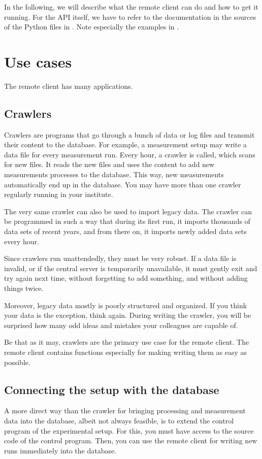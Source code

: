 \documentclass[a4paper,11pt,english]{sphinxmanual}
\begin{document}
In the following, we will describe what the remote client can do and how to get
it running.  For the API itself, we have to refer to the documentation in the
sources of the Python files in .  Note especially the
examples in .


\section{Use cases}
\label{programming/remote_client:use-cases}
The remote client has many applications.


\subsection{Crawlers}
\label{programming/remote_client:crawlers}\label{programming/remote_client:index-1}
Crawlers are programs that go through a bunch of data or log files and transmit
their content to the database.  For example, a measurement setup may write a
data file for every measurement run.  Every hour, a crawler is called, which
scans for new files.  It reads the new files and uses the content to add new
measurements processes to the database.  This way, new measurements
automatically end up in the database.  You may have more than one crawler
regularly running in your institute.

The very same crawler can also be used to import legacy data.  The crawler can
be programmed in such a way that during its first run, it imports thousands of
data sets of recent years, and from there on, it imports newly added data sets
every hour.

Since crawlers run unattendedly, they must be very robust.  If a data file is
invalid, or if the central server is temporarily unavailable, it must gently
exit and try again next time, without forgetting to add something, and without
adding things twice.

Moreover, legacy data mostly is poorly structured and organized.  If you think
your data is the exception, think again.  During writing the crawler, you will
be surprised how many odd ideas and mistakes your colleagues are capable of.

Be that as it may, crawlers are the primary use case for the remote client.
The remote client contains functions especially for making writing them as easy
as possible.


\subsection{Connecting the setup with the database}
\label{programming/remote_client:connecting-the-setup-with-the-database}
A more direct way than the crawler for bringing processing and measurement data
into the database, albeit not always feasible, is to extend the control program
of the experimental setup.  For this, you must have access to the source code
of the control program.  Then, you can use the remote client for writing new
runs immediately into the database.
\end{document}
